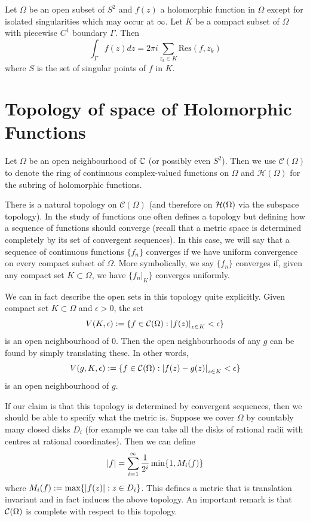 \begin{theorem}
    Let $\Omega$ be an open subset of $S^2$ and $f(z)$ a holomorphic function in $\Omega$ except for isolated singularities which may occur at $\infty$. Let $K$ be a compact subset of $\Omega$ with piecewise $C^1$ boundary $\Gamma$. Then
    $$\int_{\Gamma} f(z) dz = 2\pi i \sum_{z_k \in K} \text{Res}(f, z_k)$$
    where $S$ is the set of singular points of $f$ in $K$. 
\end{theorem}


\section{Topology of space of Holomorphic Functions}
Let $\Omega$ be an open neighbourhood of $\mathbb{C}$ (or possibly even $S^2$). Then we use $\mathcal{C}(\Omega)$ to denote the ring of continuous complex-valued functions on $\Omega$ and $\mathcal{H}(\Omega)$ for the subring of holomorphic functions.

There is a natural topology on $\mathcal{C}(\Omega)$ (and therefore on $\mathcal{H}(\Omega)$ via the subspace topology). In the study of functions one often defines a topology but defining how a sequence of functions should converge (recall that a metric space is determined completely by its set of convergent sequences). In this case, we will say that a sequence of continuous functions $\{f_n\}$ converges if we have uniform convergence on every compact subset of $\Omega$. More symbolically, we say $\{f_n\}$ converges if, given any compact set $K \subset \Omega$, we have $\{f_n|_K\}$ converges uniformly. 

We can in fact describe the open sets in this topology quite explicitly. Given compact set $K \subset \Omega$ and $\epsilon > 0$, the set 
$$V(K, \epsilon) := \{f \in \mathcal{C}(\Omega) : \left|f(z)\right|_{z \in K} < \epsilon\}$$ 
is an open neighbourhood of 0. Then the open neighbourhoods of any $g$ can be found by simply translating these. In other words,
$$V(g, K, \epsilon) := \{f \in \mathcal{C}(\Omega) : \left|f(z) - g(z)\right|_{z \in K} < \epsilon\}$$
is an open neighbourhood of $g$.

If our claim is that this topology is determined by convergent sequences, then we should be able to specify what the metric is. Suppose we cover $\Omega$ by countably many closed disks $D_i$ (for example we can take all the disks of rational radii with centres at rational coordinates). Then we can define
$$\left|f\right| = \sum_{i = 1}^\infty \frac{1}{2^i} \min \{ 1, M_i(f) \}$$
where $M_i(f) := \max\{ \left|f(z)\right| : z \in D_i \}$. This defines a metric that is translation invariant and in fact induces the above topology. An important remark is that $\mathcal{C}(\Omega)$ is complete with respect to this topology.

